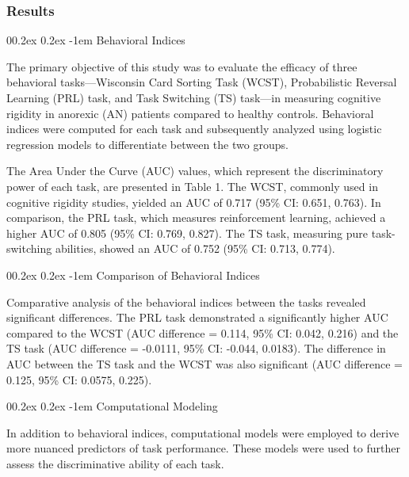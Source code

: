 \documentclass[
  man]{apa6}
\makeatletter
\let\oldparagraph\paragraph
\renewcommand{\paragraph}{
    \@ifstar
      \xxxParagraphStar
      \xxxParagraphNoStar
  }
\newcommand{\xxxParagraphStar}[1]{\oldparagraph*{#1}\mbox{}}
\newcommand{\xxxParagraphNoStar}[1]{\oldparagraph{#1}\mbox{}}
\renewcommand{\paragraph}{\@startsection{paragraph}{4}{\parindent}%
  {0\baselineskip \@plus 0.2ex \@minus 0.2ex}%
  {-1em}%
  {\normalfont\normalsize\bfseries\itshape\typesectitle}}
\makeatother
\begin{document}
\subsubsection{Results}\label{results-1}

\paragraph{Behavioral Indices}\label{behavioral-indices}

The primary objective of this study was to evaluate the efficacy of three behavioral tasks---Wisconsin Card Sorting Task (WCST), Probabilistic Reversal Learning (PRL) task, and Task Switching (TS) task---in measuring cognitive rigidity in anorexic (AN) patients compared to healthy controls. Behavioral indices were computed for each task and subsequently analyzed using logistic regression models to differentiate between the two groups.

The Area Under the Curve (AUC) values, which represent the discriminatory power of each task, are presented in Table 1. The WCST, commonly used in cognitive rigidity studies, yielded an AUC of 0.717 (95\% CI: 0.651, 0.763). In comparison, the PRL task, which measures reinforcement learning, achieved a higher AUC of 0.805 (95\% CI: 0.769, 0.827). The TS task, measuring pure task-switching abilities, showed an AUC of 0.752 (95\% CI: 0.713, 0.774).

\paragraph{Comparison of Behavioral Indices}\label{comparison-of-behavioral-indices}

Comparative analysis of the behavioral indices between the tasks revealed significant differences. The PRL task demonstrated a significantly higher AUC compared to the WCST (AUC difference = 0.114, 95\% CI: 0.042, 0.216) and the TS task (AUC difference = -0.0111, 95\% CI: -0.044, 0.0183). The difference in AUC between the TS task and the WCST was also significant (AUC difference = 0.125, 95\% CI: 0.0575, 0.225).

\paragraph{Computational Modeling}\label{computational-modeling-2}

In addition to behavioral indices, computational models were employed to derive more nuanced predictors of task performance. These models were used to further assess the discriminative ability of each task.
\end{document}

